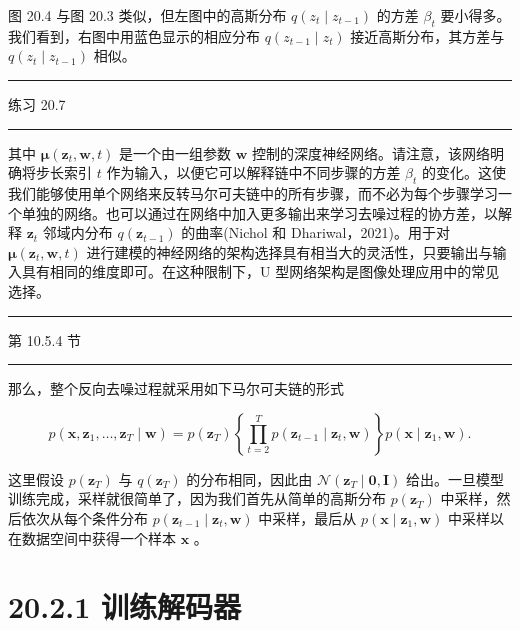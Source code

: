 \documentclass[10pt]{article}
\newcommand{\HRule}{\begin{center}\rule{0.9\linewidth}{0.2mm}\end{center}}
\begin{document}
图 20.4 与图 20.3 类似，但左图中的高斯分布 \(q\left( {{z}_{t} \mid  {z}_{t - 1}}\right)\) 的方差 \({\beta }_{t}\) 要小得多。我们看到，右图中用蓝色显示的相应分布 \(q\left( {{z}_{t - 1} \mid  {z}_{t}}\right)\) 接近高斯分布，其方差与 \(q\left( {{z}_{t} \mid  {z}_{t - 1}}\right)\) 相似。

\HRule

练习 20.7

\HRule

其中 \(\mathbf{\mu }\left( {{\mathbf{z}}_{t},\mathbf{w},t}\right)\) 是一个由一组参数 \(\mathbf{w}\) 控制的深度神经网络。请注意，该网络明确将步长索引 \(t\) 作为输入，以便它可以解释链中不同步骤的方差 \({\beta }_{t}\) 的变化。这使我们能够使用单个网络来反转马尔可夫链中的所有步骤，而不必为每个步骤学习一个单独的网络。也可以通过在网络中加入更多输出来学习去噪过程的协方差，以解释 \({\mathbf{z}}_{t}\) 邻域内分布 \(q\left( {\mathbf{z}}_{t - 1}\right)\) 的曲率(Nichol 和 Dhariwal，2021)。用于对 \(\mathbf{\mu }\left( {{\mathbf{z}}_{t},\mathbf{w},t}\right)\) 进行建模的神经网络的架构选择具有相当大的灵活性，只要输出与输入具有相同的维度即可。在这种限制下，U 型网络架构是图像处理应用中的常见选择。

\HRule

第 10.5.4 节

\HRule

那么，整个反向去噪过程就采用如下马尔可夫链的形式

\[
p\left( {\mathbf{x},{\mathbf{z}}_{1},\ldots ,{\mathbf{z}}_{T} \mid  \mathbf{w}}\right)  = p\left( {\mathbf{z}}_{T}\right) \left\{  {\mathop{\prod }\limits_{{t = 2}}^{T}p\left( {{\mathbf{z}}_{t - 1} \mid  {\mathbf{z}}_{t},\mathbf{w}}\right) }\right\}  p\left( {\mathbf{x} \mid  {\mathbf{z}}_{1},\mathbf{w}}\right) . \tag{20.19}
\]

这里假设 \(p\left( {\mathbf{z}}_{T}\right)\) 与 \(q\left( {\mathbf{z}}_{T}\right)\) 的分布相同，因此由 \(\mathcal{N}\left( {{\mathbf{z}}_{T} \mid  \mathbf{0},\mathbf{I}}\right)\) 给出。一旦模型训练完成，采样就很简单了，因为我们首先从简单的高斯分布 \(p\left( {\mathbf{z}}_{T}\right)\) 中采样，然后依次从每个条件分布 \(p\left( {{\mathbf{z}}_{t - 1} \mid  {\mathbf{z}}_{t},\mathbf{w}}\right)\) 中采样，最后从 \(p\left( {\mathbf{x} \mid  {\mathbf{z}}_{1},\mathbf{w}}\right)\) 中采样以在数据空间中获得一个样本 \(\mathbf{x}\) 。

\section*{20.2.1 训练解码器}
\end{document}
